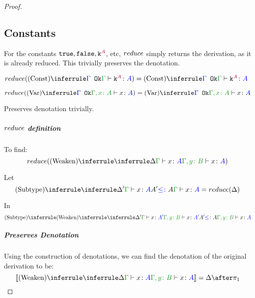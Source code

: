 \documentclass{report}
\begin{document}
\begin{framed}
\begin{proof}
    
        
            \subsection{Constants}
                For the constants $\texttt{true}, \texttt{false}, \texttt{k}^{\color{purple} A}$, etc, $reduce$ simply returns the derivation, as it is already reduced. This trivially preserves the denotation.
        
                $\reduce(\truleconst) = \truleconst$
        
                \case{\vvar}
                \begin{equation}
                    \reduce(\ntreeruleI{\vvar}{\ok{\G}}{\typerelation{\gax}{x}{A}}) =  \ntreeruleI{\vvar}{\ok{\G}}{\typerelation{\gax}{x}{A}}
                \end{equation}
        
                Preserves denotation trivially.
        
                \case{\vweaken}
                \subparagraph{$reduce$ definition}
                To find:
                \begin{equation}
                    \reduce(\ntreeruleI{\vweaken}{\treeruleI{\D}{\gtyperelation{x}{A}}}{\typerelation{\gby}{x}{A}})
                \end{equation}
        
                Let 
                \begin{equation}\label{WeakenDeltaReduction}
                    \ntreeruleII{\vsubtype}{\treeruleI{\D'}{\gtyperelation{x}{A}}}{ A'\subtype A}{\gtyperelation{x}{A}} = \reduce(\D)
                \end{equation}
        
                In 
                \begin{equation}
                    \ntreeruleII{\vsubtype}{
                    \ntreeruleI{\vweaken}{
                        \treeruleI{\D'}{\gtyperelation{x}{A'}}
                    } {
                        \typerelation{\gby}{x}{A'}
                    }
                    }{
                    A' \subtype A
                    }{\typerelation{\gby}{x}{A}}
                \end{equation}
        
                \subparagraph{Preserves Denotation}
                Using the construction of denotations, we can find the denotation of the original derivation to be:
                \begin{equation}
                    \deno{\ntreeruleI{\vweaken}{\treeruleI{\D}{\gtyperelation{x}{A}}}{\typerelation{\gby}{x}{A}}} = \D \after \p
                \end{equation}
        

\end{proof}
\end{framed}
\end{document}
